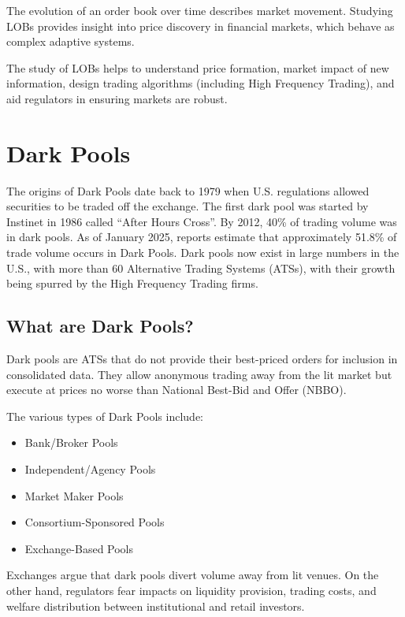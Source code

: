 The evolution of an order book over time describes market movement. Studying LOBs provides insight into price discovery in financial markets, which behave as complex adaptive systems.
 
The study of LOBs helps to understand price formation, market impact of new information, design trading algorithms (including High Frequency Trading), and aid regulators in ensuring markets are robust.
\cite{Cartea2015}

\section{Dark Pools}
The origins of Dark Pools date back to 1979 when U.S. regulations allowed securities to be traded off the exchange. The first dark pool was started by Instinet in 1986 called ``After Hours Cross''. By 2012, 40\% of trading volume was in dark pools. As of January 2025, reports estimate that approximately 51.8\% of trade volume occurs in Dark Pools. Dark pools now exist in large numbers in the U.S., with more than 60 Alternative Trading Systems (ATSs), with their growth being spurred by the High Frequency Trading firms.

\subsection{What are Dark Pools?}
Dark pools are ATSs that do not provide their best-priced orders for inclusion in consolidated data. They allow anonymous trading away from the lit market but execute at prices no worse than National Best-Bid and Offer (NBBO).
\cite{BUTI2017244}

The various types of Dark Pools include:
\begin{itemize}
    \item Bank/Broker Pools
    \item Independent/Agency Pools
    \item Market Maker Pools
    \item Consortium-Sponsored Pools
    \item Exchange-Based Pools
\end{itemize}

Exchanges argue that dark pools divert volume away from lit venues. On the other hand, regulators fear impacts on liquidity provision, trading costs, and welfare distribution between institutional and retail investors.

